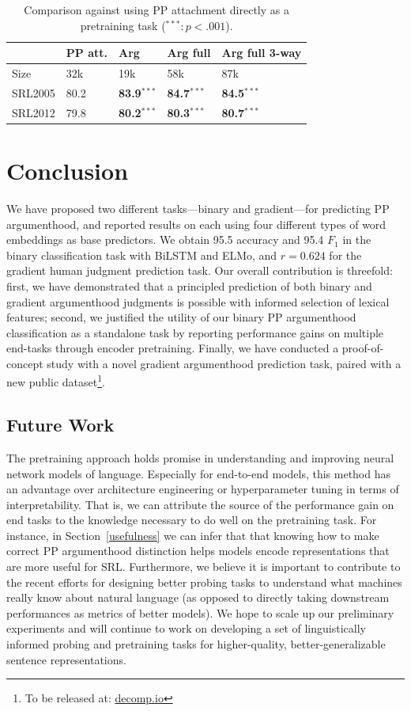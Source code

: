 \documentclass[letterpaper]{article} %
\begin{document}
\begin{table}[h]
\begin{tabular}{@{}lllll@{}}
\toprule
\hspace{1.2cm} & PP att. & Arg & Arg full & Arg full 3-way  \\ \midrule
Size & 32k & 19k & 58k & 87k  \\ \midrule
SRL2005   & 80.2  & \textbf{83.9$^{***}$} & \textbf{84.7$^{***}$} & \textbf{84.5$^{***}$}    \\
SRL2012   & 79.8    & \textbf{80.2$^{***}$} & \textbf{80.3$^{***}$} & \textbf{80.7$^{***}$}    \\
\bottomrule
\end{tabular}
\caption{\normalsize Comparison against using PP attachment directly as a pretraining task ($^{***}: p<.001$).}
\label{exp:comparison}
\end{table}

\section{Conclusion}
We have proposed two different tasks---binary and gradient---for predicting PP argumenthood, and reported results on each using four different types of word embeddings as base predictors. We obtain 95.5 accuracy and 95.4 $F_1$ in the binary classification task with BiLSTM and ELMo, and $r=0.624$ for the gradient human judgment prediction task. Our overall contribution is threefold: first, we have demonstrated that a principled prediction of both binary and gradient argumenthood judgments is possible with informed selection of lexical features; second, we justified the utility of our binary PP argumenthood classification as a standalone task by reporting performance gains on multiple end-tasks through encoder pretraining. Finally, we have conducted a proof-of-concept study with a novel gradient argumenthood prediction task, paired with a new public dataset\footnote{To be released at: \url{decomp.io}}.

\subsection{Future Work}
The pretraining approach holds promise in understanding and improving neural network models of language. Especially for end-to-end models, this method has an advantage over architecture engineering or hyperparameter tuning in terms of interpretability. That is, we can attribute the source of the performance gain on end tasks to the knowledge necessary to do well on the pretraining task. For instance, in Section~\ref{usefulness} we can infer that that knowing how to make correct PP argumenthood distinction helps models encode representations that are more useful for SRL. Furthermore, we believe it is important to contribute to the recent efforts for designing better probing tasks to understand what machines really know about natural language (as opposed to directly taking downstream performances as metrics of better models). We hope to scale up our preliminary experiments and will continue to work on developing a set of linguistically informed probing and pretraining tasks for higher-quality, better-generalizable sentence representations.
\end{document}
